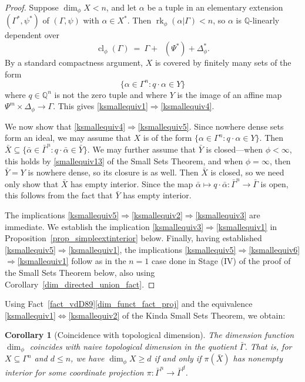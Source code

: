\documentclass[11pt]{amsart}
\theoremstyle{plain}
\newtheorem{cor}[thm]{Corollary}
\theoremstyle{definition}
\numberwithin{equation}{section}
\newcommand\Q{\mathbb{Q}}
\DeclareMathOperator\lspan{span}
\DeclareMathOperator\Qspan{\lspan_{\Q}}
\newcommand\0{\varnothing}
\DeclareMathOperator\cl{cl}
\DeclareMathOperator\rk{rk}
\begin{document}
\begin{proof}
Suppose $\dim_\phi X < n$, and let $\alpha$ be a tuple in an elementary extension $(\Gamma^*, \psi^*)$ of $(\Gamma,\psi)$ with $\alpha \in X^*$. Then $\rk_\phi(\alpha|\Gamma)<n$, so $\alpha$ is $\Q$-linearly dependent over
\[
\cl_{\phi}(\Gamma)\ =\ \Gamma + \Qspan(\Psi^*)+ \Delta_\phi^*.
\]
By a standard compactness argument, $X$ is covered by finitely many sets of the form 
\[
\{\alpha \in \Gamma^n:q\cdot \alpha \in Y\}
\]
where $q \in \Q^n$ is not the zero tuple and where $Y$ is the image of an affine map $\Psi^{m}\times\Delta_{\phi}\to\Gamma$. This gives \eqref{ksmallequiv1}$\Rightarrow$\eqref{ksmallequiv4}. 

We now show that \eqref{ksmallequiv4}$\Rightarrow$\eqref{ksmallequiv5}. Since nowhere dense sets form an ideal, we may assume that $X$ is of the form $\{\alpha \in \Gamma^n:q\cdot \alpha \in Y\}$. Then $\bar{X} \subseteq \{\bar{\alpha} \in \bar{\Gamma}^n:q\cdot \bar{\alpha} \in \bar{Y}\}$. 
We may further assume that $\bar{Y}$ is closed---when  $\phi < \infty$, this holds by \eqref{smallequiv13} of the Small Sets Theorem, and when $\phi = \infty$, then $\bar{Y} = Y$ is nowhere dense, so its closure is as well. Then $\bar{X}$ is closed, so we need only show that $\bar{X}$ has empty interior. Since the map $\bar{\alpha}\mapsto q\cdot \bar{\alpha}\colon \bar{\Gamma}^n\to \bar{\Gamma}$ is open, this follows from the fact that $\bar{Y}$ has empty interior. 

The implications \eqref{ksmallequiv5}$\Rightarrow$\eqref{ksmallequiv2}$\Rightarrow$\eqref{ksmallequiv3} are immediate. We establish the implication \eqref{ksmallequiv3}$\Rightarrow$\eqref{ksmallequiv1} in Proposition~\ref{prop_simpleextinterior} below.
Finally, having established \eqref{ksmallequiv5}$\Rightarrow$\eqref{ksmallequiv1}, the implications \eqref{ksmallequiv5}$\Rightarrow$\eqref{ksmallequiv6}$\Rightarrow$\eqref{ksmallequiv1} follow as in the $n=1$ case done in Stage (IV) of the proof of the Small Sets Theorem below, also using Corollary~\ref{dim_directed_union_fact}.
\end{proof}

\noindent
Using Fact~\ref{fact_vdD89}\eqref{dim_funct_fact_proj} and the equivalence \eqref{ksmallequiv1}$\Leftrightarrow$\eqref{ksmallequiv2} of the Kinda Small Sets Theorem, we obtain:
\begin{cor}[Coincidence with topological dimension]\label{agreement_topological_dimension}
The dimension function $\dim_\phi$ coincides with naive topological dimension in the quotient $\bar{\Gamma}$. That is, for $X \subseteq \Gamma^n$ and $d \leq n$, we have $\dim_\phi X \geq d$ if and only if $\pi(\bar{X})$ has nonempty interior for some coordinate projection $\pi\colon \bar{\Gamma}^n\to \bar{\Gamma}^d$.
\end{cor}
\end{document}
